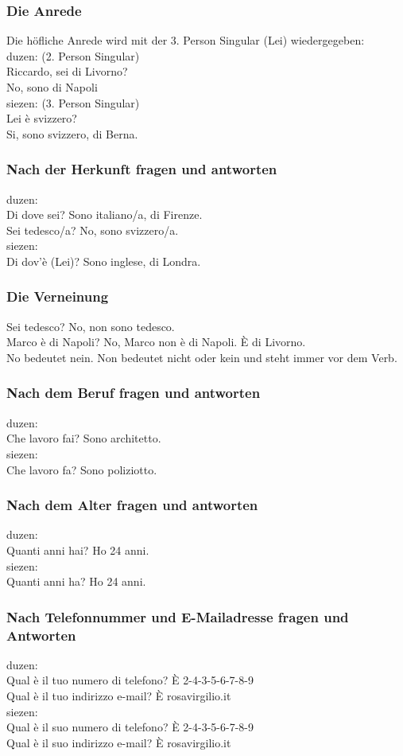 \documentclass[10pt]{scrartcl}
\begin{document}
\begin{multicols*}{2}
\subsubsection*{Die Anrede}
Die höfliche Anrede wird mit der 3. Person Singular (Lei) wiedergegeben:\\
duzen: (2. Person Singular)\\
Riccardo, sei di Livorno?\\
No, sono di Napoli\\
siezen: (3. Person Singular)\\
Lei è svizzero? \\
Si, sono svizzero, di Berna.
\subsubsection*{Nach der Herkunft fragen und antworten}
duzen:\\
Di dove sei? \bigskip Sono italiano/a, di Firenze.\\
Sei tedesco/a? \bigskip No, sono svizzero/a.\\
siezen:\\
Di dov'è (Lei)? \bigskip Sono inglese, di Londra.
\subsubsection*{Die Verneinung}
Sei tedesco? \bigskip No, non sono tedesco.\\
Marco è di Napoli? \bigskip No, Marco non è di Napoli. È di Livorno.\\
No bedeutet nein. Non bedeutet nicht oder kein und steht immer vor dem Verb.
\subsubsection*{Nach dem Beruf fragen und antworten}
duzen: \\
Che lavoro fai? \bigskip Sono architetto.\\
siezen:\\
Che lavoro fa? \bigskip Sono poliziotto.
\subsubsection*{Nach dem Alter fragen und antworten}
duzen: \\
Quanti anni hai? \bigskip Ho 24 anni.\\
siezen:\\
Quanti anni ha? \bigskip Ho 24 anni.
\subsubsection*{Nach Telefonnummer und E-Mailadresse fragen und Antworten}
duzen:\\
Qual è il tuo numero di telefono? \bigskip È 2-4-3-5-6-7-8-9\\
Qual è il tuo indirizzo e-mail? \bigskip È rosa\@ virgilio.it\\
siezen:\\
Qual è il suo numero di telefono? \bigskip È 2-4-3-5-6-7-8-9\\
Qual è il suo indirizzo e-mail? \bigskip È rosa\@ virgilio.it

\end{multicols*}
\end{document}
